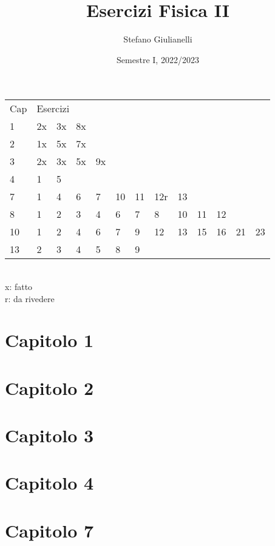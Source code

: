 \documentclass[12pt]{article}
\begin{document}
\author{Stefano Giulianelli}
\title{Esercizi Fisica II}
\date{Semestre I, 2022/2023}
\maketitle{}
\tableofcontents{}
\begin{tabular}{ l l l l l l l l l l l l l }
  Cap & \multicolumn{12}{l}{Esercizi}\\
  1 & 2x & 3x & 8x &&&&&&&&&\\
  2 & 1x & 5x & 7x &&&&&&&&&\\
  3 & 2x & 3x & 5x & 9x &&&&&&&&\\
  4 & 1 & 5 &&&&&&&&&&\\
  7 & 1 & 4 & 6 & 7 & 10 & 11 & 12r & 13 &&&&\\
  8 & 1 & 2 & 3 & 4 & 6 & 7 & 8 & 10 & 11 & 12 &&\\
  10 & 1 & 2 & 4 & 6 & 7 & 9 & 12 & 13 & 15 & 16 & 21 & 23 \\
  13 & 2 & 3 & 4 & 5 & 8 & 9 &&&&&& \\
\end{tabular}
\\x: fatto
\\r: da rivedere
\newpage

\section*{Capitolo 1}



\section*{Capitolo 2}



\section*{Capitolo 3}




\section*{Capitolo 4}


\section*{Capitolo 7}








\end{document}
